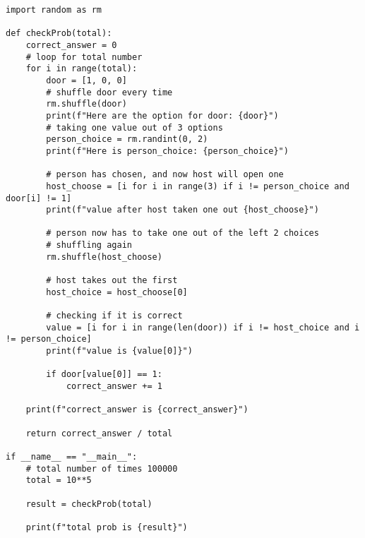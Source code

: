 \documentclass[10pt,letterpaper]{article}
\begin{document}
\begin{lstlisting}
import random as rm

def checkProb(total):
    correct_answer = 0
    # loop for total number
    for i in range(total):
        door = [1, 0, 0]
        # shuffle door every time
        rm.shuffle(door)
        print(f"Here are the option for door: {door}")
        # taking one value out of 3 options
        person_choice = rm.randint(0, 2)
        print(f"Here is person_choice: {person_choice}")
        
        # person has chosen, and now host will open one
        host_choose = [i for i in range(3) if i != person_choice and door[i] != 1]
        print(f"value after host taken one out {host_choose}")
        
        # person now has to take one out of the left 2 choices
        # shuffling again
        rm.shuffle(host_choose)
        
        # host takes out the first
        host_choice = host_choose[0]
        
        # checking if it is correct
        value = [i for i in range(len(door)) if i != host_choice and i != person_choice]
        print(f"value is {value[0]}")
        
        if door[value[0]] == 1:
            correct_answer += 1
    
    print(f"correct_answer is {correct_answer}")
    
    return correct_answer / total

if __name__ == "__main__":
    # total number of times 100000
    total = 10**5
    
    result = checkProb(total)
    
    print(f"total prob is {result}")
\end{lstlisting}
\end{document}
